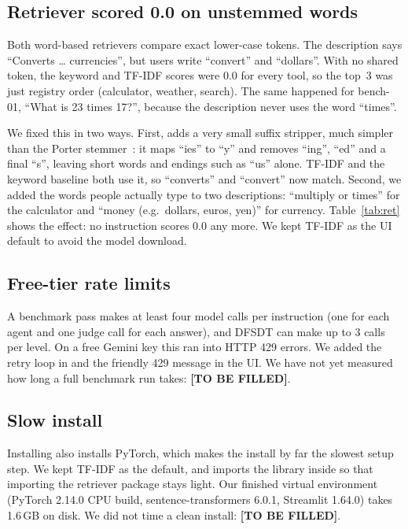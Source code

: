 \documentclass[conference,a4paper]{IEEEtran}
\newcommand{\tbf}{\textbf{[TO BE FILLED]}}
\begin{document}
\subsection{Retriever scored 0.0 on unstemmed words}\label{sec:stem}
Both word-based retrievers compare exact lower-case tokens. The
 description says ``Converts \ldots{} currencies'',
but users write ``convert'' and ``dollars''. With no shared token, the
keyword and TF-IDF scores were 0.0 for every tool, so the top~3 was just
registry order (calculator, weather, search). The same happened for bench-01, ``What is 23 times 17?'', because the
 description never uses the word ``times''.

We fixed this in two ways. First,  adds a very
small suffix stripper, much simpler than the Porter
stemmer~\cite{porter1980}: it maps ``ies'' to ``y'' and removes ``ing'',
``ed'' and a final ``s'', leaving short words and endings such as ``us''
alone. TF-IDF and the keyword baseline both use it, so ``converts'' and
``convert'' now match. Second, we added the words people actually type to
two descriptions: ``multiply or times'' for the calculator and ``money
(e.g.\ dollars, euros, yen)'' for currency. Table~\ref{tab:ret} shows the
effect: no instruction scores 0.0 any more. We kept TF-IDF as the UI
default to avoid the model download.

\subsection{Free-tier rate limits}
A benchmark pass makes at least four model calls per instruction (one
for each agent and one judge call for each answer), and DFSDT can make up
to 3 calls per level. On a free Gemini key this ran into HTTP 429 errors.
We added the retry loop in  and the friendly 429 message
in the UI. We have not yet measured how long a full benchmark run
takes: \tbf{}.

\subsection{Slow install}
Installing  also installs PyTorch, which
makes the  install by far the slowest setup step. We kept TF-IDF as the
default, and  imports the library inside
 so that importing the retriever package stays light.
Our finished virtual environment (PyTorch 2.14.0 CPU build,
sentence-transformers 6.0.1, Streamlit 1.64.0) takes 1.6\,GB on disk.
We did not time a clean install: \tbf{}.
\end{document}
